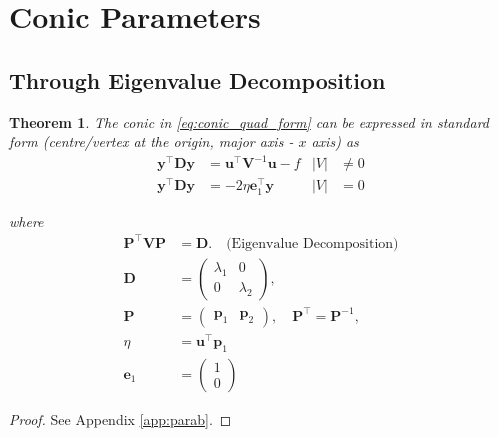 \documentclass[]{interact}
\theoremstyle{plain}%
\newtheorem{theorem}{Theorem}[section]
\theoremstyle{definition}
\theoremstyle{remark}
\providecommand{\abs}[1]{\lvert#1\rvert}
\newcommand{\myvec}[1]{\ensuremath{\begin{pmatrix}#1\end{pmatrix}}}
\let\vec\mathbf
\begin{document}
\section{Conic Parameters }
\subsection{Through  Eigenvalue Decomposition}
\begin{theorem}
  The conic in     \eqref{eq:conic_quad_form} can be expressed in standard form (centre/vertex at the origin, major axis - $x$ axis) as
  \begin{align}
    \label{eq:conic_simp_temp_nonparab}
    \vec{y}^{\top}\vec{D}\vec{y} &=  \vec{u}^{\top}\vec{V}^{-1}\vec{u} -f  &  \abs{V} &\ne 0
    \\
    \vec{y}^{\top}\vec{D}\vec{y} &=  -2\eta\vec{e}_1^{\top}\vec{y}   & \abs{V} &= 0
    \label{eq:conic_simp_temp_parab}
    \end{align}

    where
    \begin{align}
      \label{eq:conic_parmas_eig_def}
      \vec{P}^{\top}\vec{V}\vec{P} &= \vec{D}. \quad \text{(Eigenvalue Decomposition)}
      \\
      \vec{D} &= \myvec{\lambda_1 & 0\\ 0 & \lambda_2}, 
      \\
      \vec{P} &= \myvec{\vec{p}_1 & \vec{p}_2}, \quad \vec{P}^{\top}=\vec{P}^{-1},
      \label{eq:eigevecP}
      \\
      \label{eq:eta}
       \eta &=\vec{u}^{\top}\vec{p}_1
       \\
       \vec{e}_1 &=\myvec{1 \\ 0}
      \end{align}
      
\end{theorem}
\begin{proof}
  See Appendix \ref{app:parab}.
  \end{proof}
  
\end{document}
